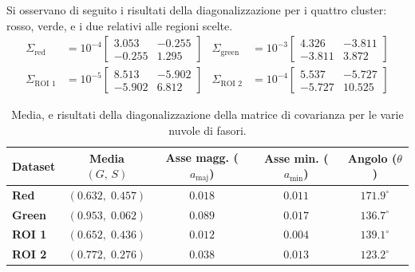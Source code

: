 Si osservano di seguito i risultati della diagonalizzazione per i quattro cluster: rosso, verde, e i due relativi alle regioni scelte.
\begin{align*}
    \Sigma_{\text{red}} &= 10^{-4} \begin{bmatrix} 
        3.053 & -0.255 \\ 
        -0.255 & 1.295 
    \end{bmatrix} &
    \Sigma_{\text{green}} &= 10^{-3} \begin{bmatrix} 
        4.326 & -3.811 \\ 
        -3.811 & 3.872 
    \end{bmatrix} \\[0.8em]
    \Sigma_{\text{ROI 1}} &= 10^{-5} \begin{bmatrix} 
        8.513 & -5.902 \\ 
        -5.902 & 6.812 
    \end{bmatrix} &
    \Sigma_{\text{ROI 2}} &= 10^{-4} \begin{bmatrix} 
        5.537 & -5.727 \\ 
        -5.727 & 10.525
    \end{bmatrix}
\end{align*}
\begin{table}[h!]
    \centering
    \setlength{\tabcolsep}{5pt} 
    \renewcommand{\arraystretch}{1.3}
    \begin{tabular}{l c c c c}
        \toprule 
        \textbf{Dataset} & \textbf{Media $(G,\, S)$} & \textbf{Asse magg. ($a_{\text{maj}}$)} & \textbf{Asse min. ($a_{\text{min}}$)} & \textbf{Angolo ($\theta$)} \\
        \midrule
        \textbf{Red} & $(0.632,\; 0.457)$ & $0.018$ & $0.011$ & $171.9^\circ$ \\
        \textbf{Green} & $(0.953,\; 0.062)$ & $0.089$ & $0.017$ & $136.7^\circ$ \\
        \textbf{ROI 1} & $(0.652,\; 0.436)$ & $0.012$ & $0.004$ & $139.1^\circ$ \\
        \textbf{ROI 2} & $(0.772,\; 0.276)$ & $0.038$ & $0.013$ & $123.2^\circ$ \\
        \bottomrule
    \end{tabular}
    \caption{Media, e risultati della diagonalizzazione della matrice di covarianza per le varie nuvole di fasori.}
    \label{tab:pca_summary}
\end{table}

